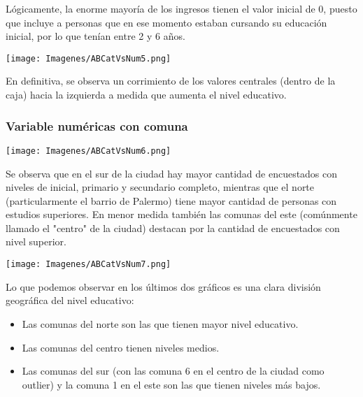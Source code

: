 \documentclass[a4paper]{article}
\begin{document}
            Lógicamente, la enorme mayoría de los ingresos tienen el valor inicial de 0, puesto que incluye a personas que en ese momento estaban cursando su educación inicial, por lo que tenían entre 2 y 6 años.
 
            \begin{center}
                \texttt{[image: Imagenes/ABCatVsNum5.png]}
            \end{center}
 
            En definitiva, se observa un corrimiento de los valores centrales (dentro de la caja) hacia la izquierda a medida que aumenta el nivel educativo.
 
        \subsubsection{Variable numéricas con comuna}
 
            \begin{center}
                \texttt{[image: Imagenes/ABCatVsNum6.png]}
            \end{center}
 
            Se observa que en el sur de la ciudad hay  mayor cantidad de encuestados con niveles de inicial, primario y secundario completo, mientras que el norte (particularmente el barrio de Palermo) tiene mayor cantidad de personas con estudios superiores. En menor medida también las comunas del este (comúnmente llamado el "centro" de la ciudad) destacan por la cantidad de encuestados con nivel superior.
 
            \begin{center}
                \texttt{[image: Imagenes/ABCatVsNum7.png]}
            \end{center}
 
            Lo que podemos observar en los últimos dos gráficos es una clara división geográfica del nivel educativo:
            \begin{itemize}
                \item Las comunas del norte son las que tienen mayor nivel educativo.
                \item Las comunas del centro tienen niveles medios.
                \item Las comunas del sur (con las comuna 6 en el centro de la ciudad como outlier) y la comuna 1 en el este son las que tienen niveles más bajos.
            \end{itemize}
           
\end{document}
